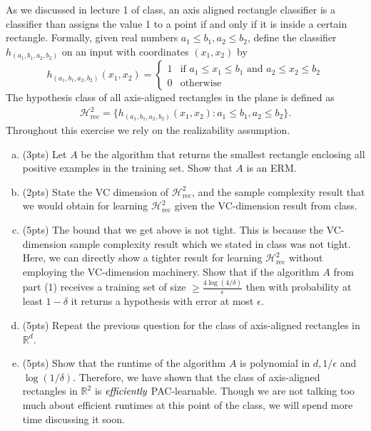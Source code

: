 \documentclass[11pt]{article}
\newcommand{\calH}{{\mathcal{H}}}
\newcommand{\blue}[1]{{\color{blue}#1}}
\newcommand{\R}{\mathbb{R}}
\begin{document}
As we discussed in lecture 1 of class, an axis aligned rectangle classifier is a classifier than assigns the value 1 to a point if and only if it is inside a certain rectangle. Formally, given real numbers $a_1\le b_1, a_2 \le b_2$, define the classifier $h_{(a_1,b_1,a_2,b_2)}$ on an input with coordinates $(x_1,x_2)$ by
    \[ 
    h_{(a_1,b_1,a_2,b_2)}(x_1, x_2) =
    \begin{cases} 
      1 & \text{if } a_1\le x_1\le b_1 \text{ and }  a_2\le x_2\le b_2\\
      0 & \text{otherwise}
   \end{cases}
\]
The hypothesis class of all axis-aligned rectangles in the plane is defined as
\begin{align*}
    \mathcal{H}_{\text{rec}}^2 = \{ h_{(a_1,b_1,a_2,b_2)}(x_1, x_2): a_1 \le b_1, a_2 \le b_2\}.
\end{align*}
Throughout this exercise we rely on the realizability assumption.
\begin{enumerate}[(a)] 
    \item (\blue{3pts}) Let $A$ be the algorithm that returns the smallest rectangle enclosing all positive examples in the training set. Show that $A$ is an ERM.
    \item (\blue{2pts}) State the VC dimension of $\calH_{\text{rec}}^2$, and the sample complexity result that we would obtain for learning $ \calH_{\text{rec}}^2$ given the VC-dimension result from class.
    \item (\blue{5pts}) The bound that we get above is not tight. This is because the VC-dimension sample complexity result which we stated in class was not tight. Here, we can directly show a tighter result for learning $\calH_{\text{rec}}^2$ without employing the VC-dimension machinery. Show that if the algorithm $A$ from part (1) receives a training set of size $\ge \frac{4 \log (4/\delta)}{\epsilon}$ then with probability at least $1-\delta$ it returns a hypothesis with error at most $\epsilon$.
    \item (\blue{5pts}) Repeat the previous question for the class of axis-aligned rectangles in $\R^d$.
    \item (\blue{5pts}) Show that the runtime of the algorithm $A$ is polynomial in $d,1/\epsilon$ and $\log(1/\delta)$. Therefore, we have shown that the class of axis-aligned rectangles in $\R^2$ is $\emph{efficiently}$ PAC-learnable. Though we are not talking too much about efficient runtimes at this point of the class, we will spend more time discussing it soon.
\end{enumerate}
\end{document}
